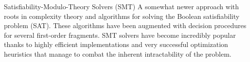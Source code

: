 \begin{paragraph}{Satisfiability-Modulo-Theory Solvers (SMT)} A somewhat newer approach with roots in complexity theory and algorithms for solving the Boolean satisfiability problem (SAT).
These algorithms have been augmented with decision procedures for several first-order fragments.
SMT solvers have become incredibly popular thanks to highly efficient implementations and very successful optimization heuristics that manage to combat the inherent intractability of the problem.
\end{paragraph}

\medskip

